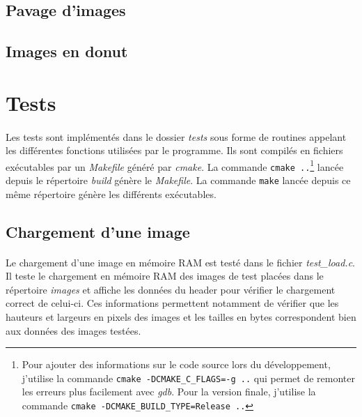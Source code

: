 \documentclass{article}
\begin{document}
    \newpage
    \subsection{Pavage d'images}
    \paragraph{}
    


    \subsection{Images en donut}




    \newpage
    \section{Tests}
    \paragraph{}
    Les tests sont implémentés dans le dossier \emph{tests} sous forme de routines appelant les différentes fonctions utilisées par le programme. Ils sont compilés en fichiers exécutables par un \emph{Makefile} généré par \emph{cmake}. La commande \texttt{cmake ..}\footnote{Pour ajouter des informations sur le code source lors du développement, j'utilise la commande \texttt{cmake -DCMAKE\_C\_FLAGS=-g ..} qui permet de remonter les erreurs plus facilement avec \emph{gdb}. Pour la version finale, j'utilise la commande \texttt{cmake -DCMAKE\_BUILD\_TYPE=Release ..}} lancée depuis le répertoire \emph{build} génère le \emph{Makefile}. La commande \texttt{make} lancée depuis ce même répertoire génère les différents exécutables.


    \subsection{Chargement d'une image}
    \paragraph{}
    Le chargement d'une image en mémoire RAM est testé dans le fichier \emph{test\_load.c}. Il teste le chargement en mémoire RAM des images de test placées dans le répertoire \emph{images} et affiche les données du header pour vérifier le chargement correct de celui-ci. Ces informations permettent notamment de vérifier que les hauteurs et largeurs en pixels des images et les tailles en bytes correspondent bien aux données des images testées.
\end{document}
